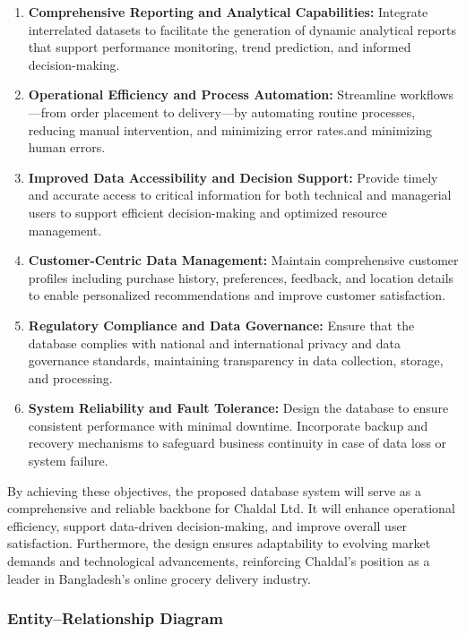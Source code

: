\documentclass[12pt,a4paper]{article}
\begin{document}
\begin{enumerate}
    \item \textbf{Comprehensive Reporting and Analytical Capabilities:} Integrate interrelated datasets to facilitate the generation of dynamic analytical reports that support performance monitoring, trend prediction, and informed decision-making.

    \item \textbf{Operational Efficiency and Process Automation:} Streamline workflows—from order placement to delivery—by automating routine processes, reducing manual intervention, and minimizing error rates.and minimizing human errors.

    \item \textbf{Improved Data Accessibility and Decision Support:} Provide timely and accurate access to critical information for both technical and managerial users to support efficient decision-making and optimized resource management.

    \item \textbf{Customer-Centric Data Management:} Maintain comprehensive customer profiles including purchase history, preferences, feedback, and location details to enable personalized recommendations and improve customer satisfaction.

    \item \textbf{Regulatory Compliance and Data Governance:} Ensure that the database complies with national and international privacy and data governance standards, maintaining transparency in data collection, storage, and processing.

    \item \textbf{System Reliability and Fault Tolerance:} Design the database to ensure consistent performance with minimal downtime. Incorporate backup and recovery mechanisms to safeguard business continuity in case of data loss or system failure.
\end{enumerate}

\noindent\textbf{} By achieving these objectives, the proposed database system will serve as a comprehensive and reliable backbone for Chaldal Ltd. It will enhance operational efficiency, support data-driven decision-making, and improve overall user satisfaction. Furthermore, the design ensures adaptability to evolving market demands and technological advancements, reinforcing Chaldal’s position as a leader in Bangladesh’s online grocery delivery industry.

\subsubsection{Entity--Relationship Diagram}
\end{document}
